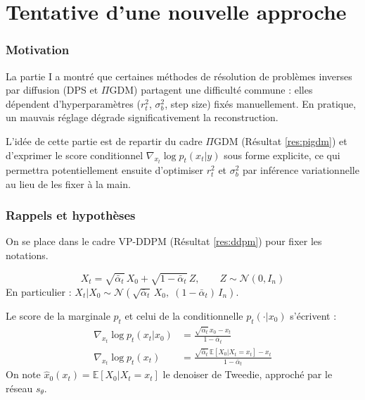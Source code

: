 \documentclass[12pt]{article}
\begin{document}
\newpage

\part{Tentative d'une nouvelle approche}

\section{Motivation}

La partie I a montré que certaines méthodes de résolution de problèmes inverses par diffusion (DPS et $\Pi$GDM) partagent une difficulté commune : elles dépendent d'hyperparamètres ($r_t^2$, $\sigma_b^2$, step size) fixés manuellement. En pratique, un mauvais réglage dégrade significativement la reconstruction.

L'idée de cette partie est de repartir du cadre $\Pi$GDM (Résultat \ref{res:pigdm}) et d'exprimer le score conditionnel $\nabla_{x_t} \log p_t(x_t | y)$ sous forme explicite, ce qui permettra potentiellement ensuite d'optimiser $r_t^2$ et $\sigma_b^2$ par inférence variationnelle au lieu de les fixer à la main.


\section{Rappels et hypothèses}

On se place dans le cadre VP-DDPM (Résultat \ref{res:ddpm}) pour fixer les notations.

\begin{rappelbox}
\begin{equation}
    X_t = \sqrt{\bar\alpha_t}\, X_0 + \sqrt{1-\bar\alpha_t}\, Z, \qquad Z \sim \mathcal{N}(0, I_n)
    \label{eq:vp_recall}
\end{equation}
En particulier : $X_t | X_0 \sim \mathcal{N}\!\left(\sqrt{\bar\alpha_t}\, X_0,\; (1-\bar\alpha_t)\, I_n\right)$.
\end{rappelbox}

\begin{rappelbox}
Le score de la marginale $p_t$ et celui de la conditionnelle $p_t(\cdot | x_0)$ s'écrivent :
\begin{align}
    \nabla_{x_t} \log p_t(x_t | x_0) &= \frac{\sqrt{\bar\alpha_t}\, x_0 - x_t}{1 - \bar\alpha_t} \label{eq:score_cond}\\[6pt]
    \nabla_{x_t} \log p_t(x_t) &= \frac{\sqrt{\bar\alpha_t}\, \mathbb{E}[X_0 | X_t = x_t] - x_t}{1 - \bar\alpha_t} \label{eq:score_marg}
\end{align}
On note $\hat{x}_0(x_t) = \mathbb{E}[X_0 | X_t = x_t]$ le denoiser de Tweedie, approché par le réseau $s_\theta$.
\end{rappelbox}
\end{document}
